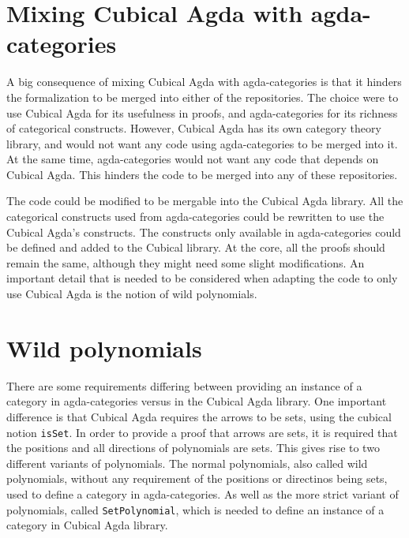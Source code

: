 




\section{Mixing Cubical Agda with agda-categories}
A big consequence of mixing Cubical Agda with agda-categories is that it hinders the formalization to be merged into either of the repositories. The choice were to use Cubical Agda for its usefulness in proofs, and agda-categories for its richness of categorical constructs. However, Cubical Agda has its own category theory library, and would not want any code using agda-categories to be merged into it. At the same time, agda-categories would not want any code that depends on Cubical Agda. This hinders the code to be merged into any of these repositories.

The code could be modified to be mergable into the Cubical Agda library. All the categorical constructs used from agda-categories could be rewritten to use the Cubical Agda's constructs. The constructs only available in agda-categories could be defined and added to the Cubical library. At the core, all the proofs should remain the same, although they might need some slight modifications. An important detail that is needed to be considered when adapting the code to only use Cubical Agda is the notion of wild polynomials.

\section{Wild polynomials}
There are some requirements differing between providing an instance of a category in agda-categories versus in the Cubical Agda library. One important difference is that Cubical Agda requires the arrows to be sets, using the cubical notion \texttt{isSet}. In order to provide a proof that arrows are sets, it is required that the positions and all directions of polynomials are sets. This gives rise to two different variants of polynomials. The normal polynomials, also called wild polynomials, without any requirement of the positions or directinos being sets, used to define a category in agda-categories. As well as the more strict variant of polynomials, called \texttt{SetPolynomial}, which is needed to define an instance of a category in Cubical Agda library. 

